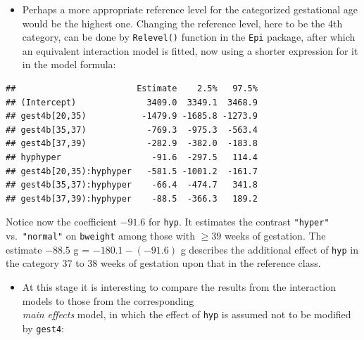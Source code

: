 \documentclass[
]{book}
\newenvironment{Shaded}{\begin{snugshade}}{\end{snugshade}}
\newcommand{\AttributeTok}[1]{\textcolor[rgb]{0.13,0.29,0.53}{#1}}
\newcommand{\DecValTok}[1]{\textcolor[rgb]{0.00,0.00,0.81}{#1}}
\newcommand{\FunctionTok}[1]{\textcolor[rgb]{0.13,0.29,0.53}{\textbf{#1}}}
\newcommand{\NormalTok}[1]{#1}
\newcommand{\OtherTok}[1]{\textcolor[rgb]{0.56,0.35,0.01}{#1}}
\newcommand{\SpecialCharTok}[1]{\textcolor[rgb]{0.81,0.36,0.00}{\textbf{#1}}}
\providecommand{\tightlist}{%
  \setlength{\itemsep}{0pt}\setlength{\parskip}{0pt}}
\begin{document}
\begin{itemize}
\tightlist
\item
  Perhaps a more appropriate reference level for the categorized gestational age would be the highest one.
  Changing the reference level, here to be the 4th category,
  can be done by \texttt{Relevel()} function in the \texttt{Epi} package,
  after which an equivalent interaction model is fitted, now using a shorter
  expression for it in the model formula:
\end{itemize}

\begin{Shaded}
\end{Shaded}

\begin{verbatim}
##                        Estimate    2.5%   97.5%
## (Intercept)              3409.0  3349.1  3468.9
## gest4b[20,35)           -1479.9 -1685.8 -1273.9
## gest4b[35,37)            -769.3  -975.3  -563.4
## gest4b[37,39)            -282.9  -382.0  -183.8
## hyphyper                  -91.6  -297.5   114.4
## gest4b[20,35):hyphyper   -581.5 -1001.2  -161.7
## gest4b[35,37):hyphyper    -66.4  -474.7   341.8
## gest4b[37,39):hyphyper    -88.5  -366.3   189.2
\end{verbatim}

Notice now the coefficient \(-91.6\) for \texttt{hyp}.
It estimates the contrast \texttt{"hyper"} vs.~\texttt{"normal"} on
\texttt{bweight} among those with \(\geq 39\) weeks of gestation.
The estimate \(-88.5\) g = \(-180.1 -(-91.6)\) g describes the additional
effect of \texttt{hyp} in the category 37 to 38 weeks of gestation upon
that in the reference class.

\begin{itemize}
\tightlist
\item
  At this stage it is interesting to compare the results from the
  interaction models to those from the corresponding\\
  \emph{main effects} model, in which the effect of \texttt{hyp}
  is assumed not to be modified by \texttt{gest4}:
\end{itemize}
\end{document}
